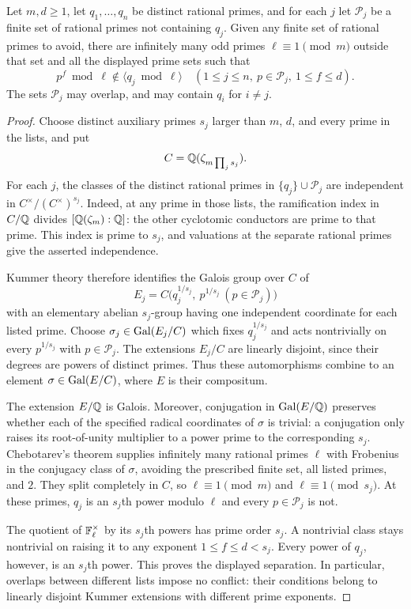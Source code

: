\begin{lemma}\label{lem:power-separation}
Let $m,d\ge1$, let $q_1,\ldots,q_n$ be distinct rational primes, and for each $j$ let $\mathcal P_j$ be a finite set of rational primes not containing $q_j$. Given any finite set of rational primes to avoid, there are infinitely many odd primes $\ell\equiv1\pmod m$ outside that set and all the displayed prime sets such that
\[
 p^f\bmod\ell\notin\langle q_j\bmod\ell\rangle
 \quad
 (1\le j\le n,\ p\in\mathcal P_j,\ 1\le f\le d).
\]
The sets $\mathcal P_j$ may overlap, and may contain $q_i$ for $i\ne j$.
\end{lemma}
\begin{proof}
Choose distinct auxiliary primes $s_j$ larger than $m$, $d$, and every prime in the lists, and put
\[
 C=\mathbb Q(\zeta_{m\prod_j s_j}).
\]
For each $j$, the classes of the distinct rational primes in $\{q_j\}\cup\mathcal P_j$ are independent in $C^\times/(C^\times)^{s_j}$. Indeed, at any prime in those lists, the ramification index in $C/\mathbb Q$ divides $[\mathbb Q(\zeta_m):\mathbb Q]$: the other cyclotomic conductors are prime to that prime. This index is prime to $s_j$, and valuations at the separate rational primes give the asserted independence.

Kummer theory therefore identifies the Galois group over $C$ of
\[
 E_j=C\bigl(q_j^{1/s_j},\ p^{1/s_j}\ (p\in\mathcal P_j)\bigr)
\]
with an elementary abelian $s_j$-group having one independent coordinate for each listed prime. Choose $\sigma_j\in\operatorname{Gal}(E_j/C)$ which fixes $q_j^{1/s_j}$ and acts nontrivially on every $p^{1/s_j}$ with $p\in\mathcal P_j$. The extensions $E_j/C$ are linearly disjoint, since their degrees are powers of distinct primes. Thus these automorphisms combine to an element $\sigma\in\operatorname{Gal}(E/C)$, where $E$ is their compositum.

The extension $E/\mathbb Q$ is Galois. Moreover, conjugation in $\operatorname{Gal}(E/\mathbb Q)$ preserves whether each of the specified radical coordinates of $\sigma$ is trivial: a conjugation only raises its root-of-unity multiplier to a power prime to the corresponding $s_j$. Chebotarev's theorem supplies infinitely many rational primes $\ell$ with Frobenius in the conjugacy class of $\sigma$, avoiding the prescribed finite set, all listed primes, and $2$. They split completely in $C$, so $\ell\equiv1\pmod m$ and $\ell\equiv1\pmod{s_j}$. At these primes, $q_j$ is an $s_j$th power modulo $\ell$ and every $p\in\mathcal P_j$ is not.

The quotient of $\mathbb F_\ell^\times$ by its $s_j$th powers has prime order $s_j$. A nontrivial class stays nontrivial on raising it to any exponent $1\le f\le d<s_j$. Every power of $q_j$, however, is an $s_j$th power. This proves the displayed separation. In particular, overlaps between different lists impose no conflict: their conditions belong to linearly disjoint Kummer extensions with different prime exponents.
\end{proof}

